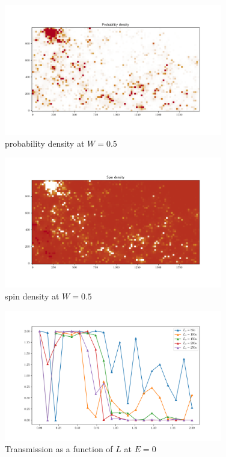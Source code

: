 \documentclass[12pt]{article}
\numberwithin{equation}{section}
\begin{document}
\newpage
\begin{figure}[h!]
  \begin{center}
  \includegraphics[width=0.85\textwidth]{./media/proba_dens_W=0dot5.png}
  \caption{probability density at $W=0.5$}
  \end{center}
\end{figure}

\begin{figure}[h!]
  \begin{center}
  \includegraphics[width=0.85\textwidth]{./media/spin_dens_W=0dot5.png}
  \caption{spin density at $W=0.5$}
  \end{center}
\end{figure}

\newpage
\begin{figure}[h!]
  \begin{center}
  \includegraphics[width=0.85\textwidth]{./media/transmission_dep_L_E=0dot0.png}
  \caption{Transmission as a function of $L$ at $E=0$}
  \end{center}
\end{figure}
\end{document}
